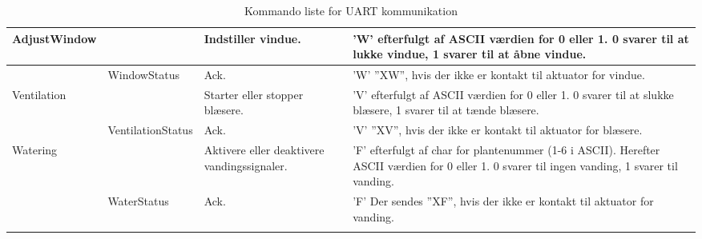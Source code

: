 \begin{longtable}{| p{3cm} | p{3cm} | p{3.2cm} | p{6cm} |}
    AdjustWindow                      & ~                             & Indstiller vindue.                                  & ’W’ efterfulgt af ASCII værdien for 0 eller 1. 0 svarer til at lukke vindue, 1 svarer til at åbne vindue.                                                                                                                                    \\ \hline
    ~                                 & WindowStatus                  & Ack.                                                & ’W’ \newline ”XW”, hvis der ikke er kontakt til aktuator for vindue.                                                                                                                                                                                  \\ \hline
    Ventilation                       & ~                             & Starter eller stopper blæsere.                      & ’V’ efterfulgt af ASCII værdien for 0 eller 1. 0 svarer til at slukke blæsere, 1 svarer til at tænde blæsere.                                                                                                                                \\ \hline
    ~                                 & VentilationStatus             & Ack.                                                & ’V’ \newline ”XV”, hvis der ikke er kontakt til aktuator for blæsere.                                                                                                                                                                                 \\ \hline
    Watering                          & ~                             & Aktivere eller deaktivere vandingssignaler.         & ’F’ efterfulgt af char for plantenummer (1-6 i ASCII). Herefter ASCII værdien for 0 eller 1. 0 svarer til ingen vanding, 1 svarer til vanding.                                                                                                \\ \hline
    ~                                 & WaterStatus                   & Ack.                                                & ’F’ \newline Der sendes ”XF”, hvis der ikke er kontakt til aktuator for vanding.                                                                                                                                                                      \\ \hline
\caption{Kommando liste for UART kommunikation}\label{tbl:kommando}
\end{longtable}